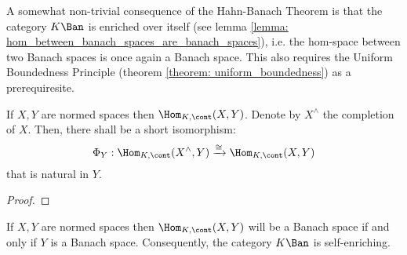         A somewhat non-trivial consequence of the Hahn-Banach Theorem is that the category $K\-\Ban$ is enriched over itself (see lemma \ref{lemma: hom_between_banach_spaces_are_banach_spaces}), i.e. the hom-space between two Banach spaces is once again a Banach space. This also requires the Uniform Boundedness Principle (theorem \ref{theorem: uniform_boundedness}) as a prerequiresite. 
        \begin{lemma} \label{lemma: domain_completion}
            If $X, Y$ are normed spaces then $\Hom_{K, \cont}(X, Y)$. Denote by $X^{\wedge}$ the completion of $X$. Then, there shall be a short isomorphism:
                $$\Phi_Y: \Hom_{K, \cont}(X^{\wedge}, Y) \xrightarrow[]{\cong} \Hom_{K, \cont}(X, Y)$$
            that is natural in $Y$.
        \end{lemma}
            \begin{proof}
            \end{proof}
        \begin{lemma} \label{lemma: hom_between_banach_spaces_are_banach_spaces}
            If $X, Y$ are normed spaces then $\Hom_{K, \cont}(X, Y)$ will be a Banach space if and only if $Y$ is a Banach space. Consequently, the category $K\-\Ban$ is self-enriching.
        \end{lemma}
